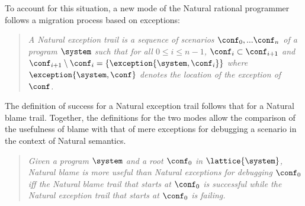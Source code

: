 To account for this situation, a new mode of the Natural rational
programmer follows a migration process based on exceptions:
\begin{quote}
\it A {\em Natural exception trail\/} is a sequence of scenarios $\conf_0,...\conf_n$ of a
program $\system$ such that for all $0 \leq i \leq n - 1$, $\conf_i \subset
\conf_{i+1}$ and $\conf_{i+1} \setminus \conf_i = \{\exception{\system, \conf_i}\}$
where $\exception{\system, \conf}$ denotes the location of the exception of $\conf$.
\end{quote}

The definition of success for a Natural exception trail follows that for
a Natural blame trail.
Together, the definitions for the two modes allow the comparison of the usefulness of blame 
with that of mere exceptions for debugging a scenario in the context of Natural semantics.
\begin{quote}
\it 
  Given a program $\system$ and a root $\conf_0$ in $\lattice{\system}$,
  Natural blame is \emph{more useful} than Natural exceptions for
  debugging $\conf_0$ iff 
  the Natural blame trail 
  that starts at $\conf_0$ is successful while the Natural exception trail that
  starts at $\conf_0$ is failing.
\end{quote}
